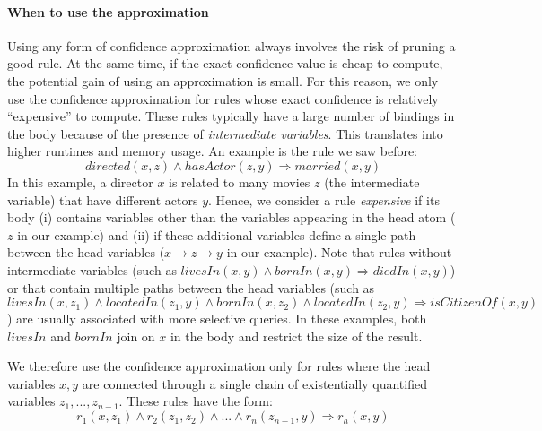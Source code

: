 \paragraph{When to use the approximation}\label{sec:expensive_rules}
Using any form of confidence approximation  always involves the risk of pruning a good rule.
At the same time, if the exact confidence value is cheap to compute, the potential gain of using an approximation is small.
For this reason, we only use the confidence approximation for rules whose exact confidence is relatively ``expensive'' to compute.
These rules typically have a large number of bindings in the body because of the presence of
\emph{intermediate variables}. This translates into
higher runtimes and memory usage. An example is the rule we saw before:
\[
 directed(x,z) \wedge hasActor(z,y) \Rightarrow married(x,y)
\]
In this example, a director $x$ is related to many movies $z$ (the intermediate variable) that have different actors $y$.
Hence, we consider a rule \emph{expensive} if its body (i) contains variables other than the variables appearing in the head atom ($z$ in our example) and
(ii) if these additional variables define a single path between the head variables ($x \rightarrow z \rightarrow y$ in our example).
Note that rules without intermediate variables (such as $livesIn(x,y)\wedge bornIn(x,y)\Rightarrow diedIn(x,y)$)
or that contain multiple paths between the head variables (such as $livesIn(x,z_1)\wedge locatedIn(z_1,y)\wedge bornIn(x,z_2)\wedge locatedIn(z_2,y) \Rightarrow isCitizenOf(x,y)$)
are usually associated with more selective queries. In these examples, both
$livesIn$ and $bornIn$ join on $x$ in the body and restrict the size of the result.

We therefore use the confidence approximation only for rules where the head variables $x,y$ are connected through a single chain of existentially quantified variables $z_1,..., z_{n-1}$. These rules have the form:
$$
  r_1(x,z_1) \wedge r_2(z_1,z_2) \wedge ... \wedge r_n(z_{n-1},y) \Rightarrow r_h(x,y)
$$

